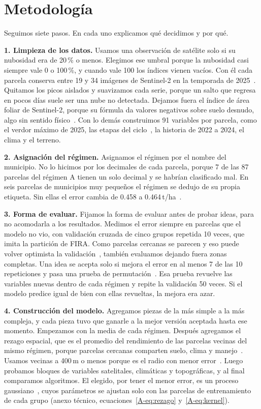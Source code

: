 \section{Metodología}\label{sec:metodologia}

Seguimos siete pasos. En cada uno explicamos qué decidimos y por qué.

\textbf{1. Limpieza de los datos.} Usamos una observación de satélite solo si su nubosidad era de 20\,\% o menos.
Elegimos ese umbral porque la nubosidad casi siempre vale 0 o 100\,\%, y cuando vale 100 los índices vienen vacíos. Con
él cada parcela conserva entre 19 y 34 imágenes de Sentinel-2 en la temporada de 2025~\cite{doc_modelo}. Quitamos los picos aislados y suavizamos cada serie, porque un salto que regresa en pocos días suele
ser una nube no detectada. Dejamos fuera el índice de área foliar de Sentinel-2, porque su fórmula da valores negativos sobre
suelo desnudo, algo sin sentido físico~\cite{ecuaciones}. Con lo demás construimos 91 variables por parcela, como el
verdor máximo de 2025, las etapas del ciclo~\cite{zadoks1974}, la historia de 2022 a 2024, el clima y el terreno.

\textbf{2. Asignación del régimen.} Asignamos el régimen por el nombre del municipio. No lo hicimos por los decimales de
cada parcela, porque 7 de las 87 parcelas del régimen A tienen un solo decimal y se habrían clasificado mal. En seis parcelas de municipios muy pequeños el régimen se dedujo de
su propia etiqueta. Sin ellas el error cambia de 0.458 a 0.464\,t/ha~\cite{doc_modelo}.

\textbf{3. Forma de evaluar.} Fijamos la forma de evaluar antes de probar ideas, para no acomodarla a los resultados.
Medimos el error siempre en parcelas que el modelo no vio, con validación cruzada de cinco grupos repetida 10 veces, que
imita la partición de FIRA. Como parcelas cercanas se parecen y eso puede volver optimista la
validación~\cite{roberts2017,ploton2020}, también evaluamos dejando fuera zonas completas. Una idea se acepta solo si
mejora el error en al menos 7 de las 10 repeticiones y pasa una prueba de permutación~\cite{ojala2010}. Esa prueba
revuelve las variables nuevas dentro de cada régimen y repite la validación 50 veces. Si el modelo predice igual de bien con ellas revueltas, la mejora era azar.

\textbf{4. Construcción del modelo.} Agregamos piezas de la más simple a la más compleja, y
cada pieza tuvo que ganarle a la mejor versión aceptada hasta ese momento. Empezamos con la media de cada
régimen. Después agregamos el rezago espacial, que es el promedio del rendimiento de las parcelas vecinas del mismo
régimen, porque parcelas cercanas comparten suelo, clima y manejo~\cite{tobler1970}. Usamos vecinas a 400\,m o menos
porque es el radio con menor error~\cite{doc_modelo}. Luego probamos bloques de variables
satelitales, climáticas y topográficas, y al final comparamos algoritmos. El elegido, por tener el menor error, es un
proceso gaussiano~\cite{rasmussen2006}, cuyos parámetros se ajustan solo con las parcelas de entrenamiento de cada grupo (anexo
técnico, ecuaciones~\ref{A-eq:rezago} y~\ref{A-eq:kernel}).

